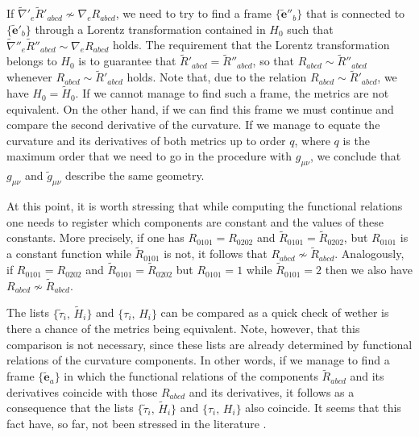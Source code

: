 \documentclass[twocolumn,prd,aps,showpacs,showkeys,amsmath,amssymb]{revtex4-1}
\begin{document}
If $\tilde{\nabla}'_e\tilde{R}'_{abcd} \nsim \nabla_e R_{abcd}$, we need to try to find a frame $\{\tilde{\mathbf{e}}''_b\}$ that is connected to $\{\tilde{\mathbf{e}}'_b\}$ through a Lorentz transformation contained in $H_0$ such that $\tilde{\nabla}''_e\tilde{R}''_{abcd} \sim \nabla_e R_{abcd}$ holds. The requirement that the Lorentz transformation belongs to $H_0$ is to guarantee that $\tilde{R}'_{abcd} = \tilde{R}''_{abcd}$, so that $R_{abcd} \sim \tilde{R}''_{abcd}$  whenever $R_{abcd} \sim \tilde{R}'_{abcd}$ holds. Note that, due to the relation $R_{abcd} \sim \tilde{R}'_{abcd}$, we have $H_0 = \tilde{H}_0$. If we cannot manage to find such a frame, the metrics are not equivalent. On the other hand, if we can find this frame we must continue and compare the second derivative of the curvature. If we manage to equate the curvature and its derivatives of both metrics up to order $q$, where $q$ is the maximum order that we need to go in the procedure with $g_{\mu\nu}$, we conclude that $g_{\mu\nu}$ and $\tilde{g}_{\mu\nu}$ describe the same geometry.


At this point, it is worth stressing that while computing the functional relations one needs to register which components are constant and the values of these constants. More precisely, if one has $R_{0101} = R_{0202}$ and $\tilde{R}_{0101} = \tilde{R}_{0202}$, but $R_{0101}$ is a constant function while $\tilde{R}_{0101}$ is not, it follows that $R_{abcd} \nsim \tilde{R}_{abcd}$. Analogously, if
$R_{0101} = R_{0202}$ and $\tilde{R}_{0101} = \tilde{R}_{0202}$ but $R_{0101} = 1$ while  $\tilde{R}_{0101} = 2$ then we also have $R_{abcd} \nsim \tilde{R}_{abcd}$.



The lists $\{\tilde{\tau}_i,\,\tilde{H}_i\}$ and $\{\tau_i,\, H_i\}$ can be compared as a quick check of wether is there a chance of the metrics being equivalent.
Note, however, that this comparison is not necessary, since these lists are already determined by functional relations of the curvature components. In other words, if we manage to find a frame $\{\tilde{\mathbf{e}}_a\}$ in which the functional relations of the components $\tilde{R}_{abcd}$ and its derivatives coincide with those $R_{abcd}$ and its derivatives, it follows as a consequence that the lists  $\{\tilde{\tau}_i,\,\tilde{H}_i\}$ and $\{\tau_i,\, H_i\}$ also coincide. It seems that this fact have, so far, not been stressed in the literature \cite{Karlhede,McNutt}.
\end{document}

